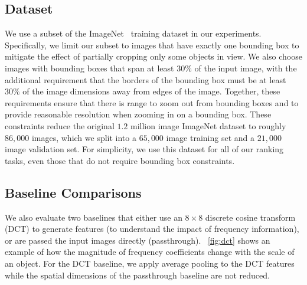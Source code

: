 

\subsection{Dataset}
\label{sec:dataset}
We use a subset of the ImageNet~\cite{deng2009imagenet} training dataset in our experiments.
Specifically, we limit our subset to images that have exactly one bounding box to mitigate the effect of partially cropping only some objects in view.
We also choose images with bounding boxes that span at least $30\%$ of the input image, with the additional requirement that the borders of the bounding box must be at least $30\%$ of the image dimensions away from edges of the image.
Together, these requirements ensure that there is range to zoom out from bounding boxes and to provide reasonable resolution when zooming in on a bounding box.
These constraints reduce the original $1.2$ million image ImageNet dataset to roughly $86,000$ images, which we split into a $65,000$ image training set and a $21,000$ image validation set.
For simplicity, we use this dataset for all of our ranking tasks, even those that do not require bounding box constraints.

\subsection{Baseline Comparisons}
We also evaluate two baselines that either use an $8\times8$ discrete cosine transform (DCT) to generate features (to understand the impact of frequency information), or are passed the input images directly (passthrough).
~\autoref{fig:dct} shows an example of how the magnitude of frequency coefficients change with the scale of an object.
For the DCT baseline, we apply average pooling to the DCT features while the spatial dimensions of the passthrough baseline are not reduced.



